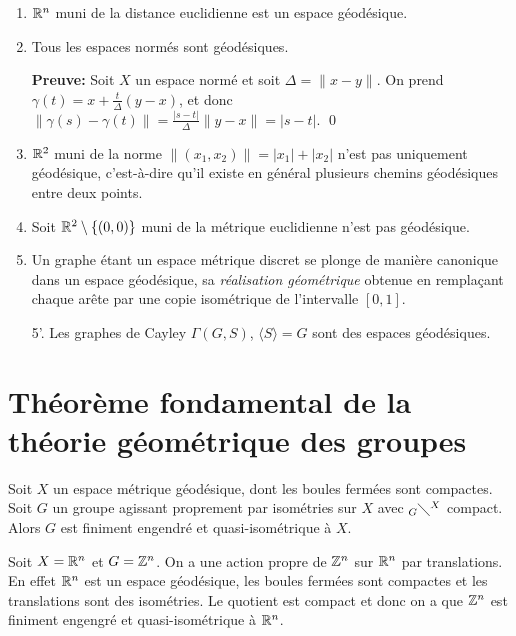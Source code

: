   \begin{exs}
    \begin{enumerate}
    \item $\mathbb{R}^n$ muni de la distance euclidienne est un espace géodésique.
    \item Tous les espaces normés sont géodésiques.

      \textbf{Preuve:} Soit $X$ un espace normé et soit $\Delta = \|x - y\|$. On prend $\gamma(t) = x +
      \frac{t}{\Delta}(y-x)$, et donc $\|\gamma(s) - \gamma(t)\| = \frac{|s-t|}{\Delta}\|y-x\| = |s-t|$. \qed

    \item $\mathbb{R}^2$ muni de la norme $\|(x_1, x_2)\| = |x_1| + |x_2|$ n'est pas uniquement géodésique,
      c'est-à-dire qu'il existe en général plusieurs chemins géodésiques entre deux points.

    \item Soit $\mathbb{R}^2 \setminus \{(0,0)\}$ muni de la métrique euclidienne n'est pas géodésique.

      
    \item Un graphe étant un espace métrique discret se plonge de manière canonique dans un espace géodésique,
      sa \emph{réalisation géométrique}  obtenue en remplaçant chaque arête par
      une copie isométrique de l'intervalle $[0,1]$.

      
    \item[5'.] Les graphes de Cayley $\Gamma(G, S)$, $\langle S \rangle = G$ sont des espaces géodésiques.
    \end{enumerate}
  \end{exs}
  
 

  \section{Théorème fondamental de la théorie géométrique des groupes}
  \label{sec:thm-fond-theorie-geom-groupes}


  \begin{theo} 
    Soit $X$ un espace métrique géodésique, dont les boules fermées sont compactes. Soit $G$ un groupe
    agissant proprement par isométries sur $X$ avec $_G\diagdown^X$ compact. Alors $G$ est finiment engendré
    et quasi-isométrique à $X$.
  \end{theo}


  \begin{ex}
    Soit $X = \mathbb{R}^n$ et $G = \mathbb{Z}^n$. On a une action propre de $\mathbb{Z}^n$ sur $\mathbb{R}^n$ par translations. En effet
    $\mathbb{R}^n$ est un espace géodésique, les boules fermées sont compactes et les translations sont des
    isométries. Le quotient est compact et donc on a que $\mathbb{Z}^n$ est finiment engengré et quasi-isométrique à
    $\mathbb{R}^n$. 
  \end{ex}

  

  




